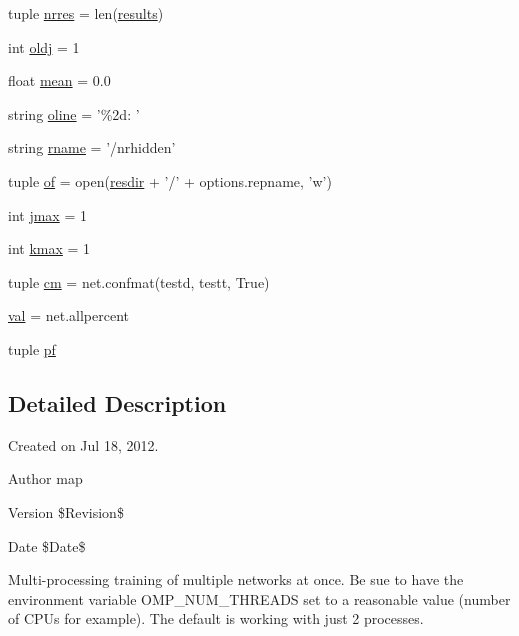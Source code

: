 \begin{DoxyCompactItemize}
\item 
tuple \hyperlink{namespacetrainnetmp_aeaf295e503c8c7a7eb9d4e5a77ed5499}{nrres} = len(\hyperlink{namespacetrainnetmp_acf60722e6b94f8b6613aff40c374d19f}{results})
\item 
int \hyperlink{namespacetrainnetmp_a645db8b07923a52025222af462801dc2}{oldj} = 1
\item 
float \hyperlink{namespacetrainnetmp_a8647e1123b531e4df1080e929f352389}{mean} = 0.0
\item 
string \hyperlink{namespacetrainnetmp_a0fc6d0db466612f63fa6df1c682394d0}{oline} = '\%2d: '
\item 
string \hyperlink{namespacetrainnetmp_a01a4fd22ee2cc1aba08b4566d95bb2a4}{rname} = '/nrhidden'
\item 
tuple \hyperlink{namespacetrainnetmp_a5348e04a55d2a7563398585f1b851efa}{of} = open(\hyperlink{namespacetrainnetmp_ab566ffaeaa6913a2b2b347cff1a608a4}{resdir} + '/' + options.repname, 'w')
\item 
int \hyperlink{namespacetrainnetmp_aa4405feef7b967d4eb9749579d3b1dad}{jmax} = 1
\item 
int \hyperlink{namespacetrainnetmp_a8c5a189bb47054d719066421ae589642}{kmax} = 1
\item 
tuple \hyperlink{namespacetrainnetmp_af36e6597c6ab86263c1f5da739583e3f}{cm} = net.confmat(testd, testt, True)
\item 
\hyperlink{namespacetrainnetmp_a72596b0af8ecedd242cba70b6819b03d}{val} = net.allpercent
\item 
tuple \hyperlink{namespacetrainnetmp_a6b1fd4837c9650e7f0526c5e9b88fc05}{pf}
\end{DoxyCompactItemize}


\subsection{Detailed Description}
Created on Jul 18, 2012. \begin{DoxyAuthor}{Author}
map 
\end{DoxyAuthor}
\begin{DoxyVersion}{Version}
\$Revision\$ 
\end{DoxyVersion}
\begin{DoxyDate}{Date}
\$Date\$
\end{DoxyDate}
Multi-\/processing training of multiple networks at once. Be sue to have the environment variable OMP\_\-NUM\_\-THREADS set to a reasonable value (number of CPUs for example). The default is working with just 2 processes.

